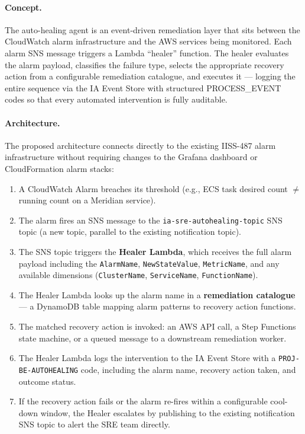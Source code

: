 \paragraph{Concept.}
The auto-healing agent is an event-driven remediation layer that sits between
the CloudWatch alarm infrastructure and the AWS services being monitored.
Each alarm SNS message triggers a Lambda ``healer'' function. The healer
evaluates the alarm payload, classifies the failure type, selects the
appropriate recovery action from a configurable remediation catalogue, and
executes it --- logging the entire sequence via the IA Event Store with
structured PROCESS\_EVENT codes so that every automated intervention is
fully auditable.

\paragraph{Architecture.}
The proposed architecture connects directly to the existing IISS-487 alarm
infrastructure without requiring changes to the Grafana dashboard or
CloudFormation alarm stacks:

\begin{enumerate}
    \item A CloudWatch Alarm breaches its threshold (e.g., ECS task desired
          count $\neq$ running count on a Meridian service).
    \item The alarm fires an SNS message to the \texttt{ia-sre-autohealing-topic}
          SNS topic (a new topic, parallel to the existing notification topic).
    \item The SNS topic triggers the \textbf{Healer Lambda}, which receives
          the full alarm payload including the \texttt{AlarmName},
          \texttt{NewStateValue}, \texttt{MetricName}, and any available
          dimensions (\texttt{ClusterName}, \texttt{ServiceName},
          \texttt{FunctionName}).
    \item The Healer Lambda looks up the alarm name in a
          \textbf{remediation catalogue} --- a DynamoDB table mapping alarm
          patterns to recovery action functions.
    \item The matched recovery action is invoked: an AWS API call, a Step
          Functions state machine, or a queued message to a downstream
          remediation worker.
    \item The Healer Lambda logs the intervention to the IA Event Store
          with a \texttt{PROJ-BE-AUTOHEALING} code, including the alarm
          name, recovery action taken, and outcome status.
    \item If the recovery action fails or the alarm re-fires within a
          configurable cool-down window, the Healer escalates by publishing
          to the existing notification SNS topic to alert the SRE team
          directly.
\end{enumerate}

